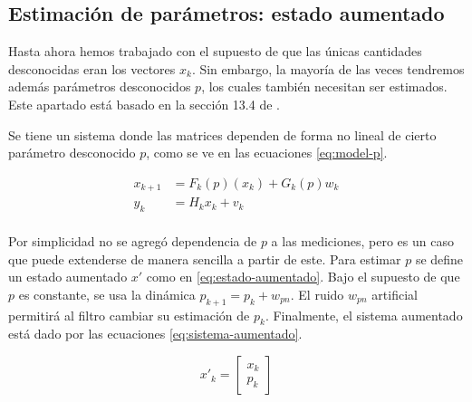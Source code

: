 



\subsection{Estimación de
parámetros: estado aumentado}\label{estimacion-de-parametros}

Hasta ahora hemos trabajado con el supuesto de que las únicas cantidades desconocidas eran los vectores \(x_k\). Sin embargo, la mayoría de las veces tendremos además parámetros desconocidos \(p\), los cuales también necesitan ser estimados. Este apartado está basado en la sección 13.4 de \cite{Simon2006}.

Se tiene un sistema donde las matrices dependen de forma no lineal de cierto parámetro desconocido \(p\), como se ve en las ecuaciones \ref{eq:model-p}.

\begin{equation}\label{eq:model-p}
\begin{aligned}
x_{k+1} &= F_k(p)(x_k) + G_k(p)w_k \\
y_{k} &= H_k x_k + v_k \\ 
\end{aligned}
\end{equation}

Por simplicidad no se agregó dependencia de \(p\) a las mediciones, pero es un caso que puede extenderse de manera sencilla a partir de este. Para estimar \(p\) se define un estado aumentado \(x'\) como en \ref{eq:estado-aumentado}. Bajo el supuesto de que \(p\) es constante, se usa la dinámica \(p_{k+1} = p_k + w_{pn}\). El ruido \(w_{pn}\) artificial permitirá al filtro cambiar su estimación de \(p_k\). Finalmente, el sistema aumentado está dado por las ecuaciones \ref{eq:sistema-aumentado}.

\begin{equation}\label{eq:estado-aumentado}
x'_k = \begin{bmatrix}x_k \\ p_k \end{bmatrix}
\end{equation}

